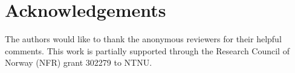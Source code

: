 








\section*{Acknowledgements}
The authors would like to thank the anonymous reviewers for their helpful comments. This work is partially supported through the Research Council of Norway (NFR) grant 302279 to NTNU.
